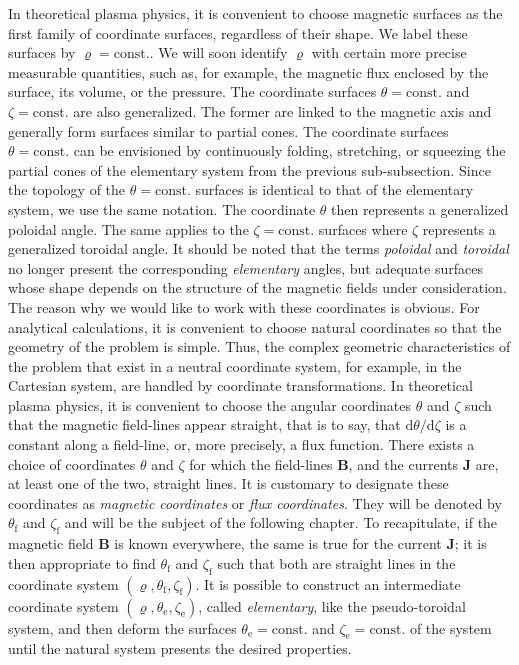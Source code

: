 In theoretical plasma physics, it is convenient to choose magnetic surfaces as the first family of coordinate surfaces, regardless of their shape. We label these surfaces by $\varrho=\text{const.}$. We will soon identify $\varrho$ with certain more precise measurable quantities, such as, for example, the magnetic flux enclosed by the surface, its volume, or the pressure. The coordinate surfaces $\theta=\text{const.}$ and $\zeta=\text{const.}$ are also generalized. The former are linked to the magnetic axis and generally form surfaces similar to partial cones. The coordinate surfaces $\theta=\text{const.}$ can be envisioned by continuously folding, stretching, or squeezing the partial cones of the elementary system from the previous sub-subsection. Since the topology of the $\theta=\text{const.}$ surfaces is identical to that of the elementary system, we use the same notation. The coordinate $\theta$ then represents a generalized poloidal angle. The same applies to the $\zeta=\text{const.}$ surfaces where $\zeta$ represents a generalized toroidal angle. It should be noted that the terms \textit{poloidal} and \textit{toroidal} no longer present the corresponding \textit{elementary} angles, but adequate surfaces whose shape depends on the structure of the magnetic fields under consideration. \quad The reason why we would like to work with these coordinates is obvious. For analytical calculations, it is convenient to choose natural coordinates so that the geometry of the problem is simple. Thus, the complex geometric characteristics of the problem that exist in a neutral coordinate system, for example, in the Cartesian system, are handled by coordinate transformations. In theoretical plasma physics, it is convenient to choose the angular coordinates $\theta$ and $\zeta$ such that the magnetic field-lines appear straight, that is to say, that $\mathrm{d}\theta/\mathrm{d}\zeta$ is a constant along a field-line, or, more precisely, a flux function. There exists a choice of coordinates $\theta$ and $\zeta$ for which the field-lines $\mathbf{B}$, and the currents $\mathbf{J}$ are, at least one of the two, straight lines. It is customary to designate these coordinates as \textit{magnetic coordinates} or \textit{flux coordinates}. They will be denoted by $\theta_\text{f}$ and $\zeta_\text{f}$ and will be the subject of the following chapter. To recapitulate, if the magnetic field $\mathbf{B}$ is known everywhere, the same is true for the current $\mathbf{J}$; it is then appropriate to find $\theta_\text{f}$ and $\zeta_\text{f}$ such that both are straight lines in the coordinate system $(\varrho, \theta_\text{f}, \zeta_\text{f})$. It is possible to construct an intermediate coordinate system $(\varrho, \theta_\text{e}, \zeta_\text{e})$, called \textit{elementary}, like the pseudo-toroidal system, and then deform the surfaces $\theta_\text{e}=\text{const.}$ and $\zeta_\text{e}=\text{const.}$ of the system until the natural system presents the desired properties.

